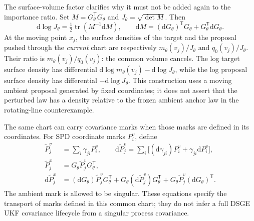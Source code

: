 \documentclass[11pt]{article}
\newcommand{\dd}{\mathrm{d}}
\begin{document}
The surface-volume factor clarifies why it must not be added again to the
importance ratio.  Set $M=G_\theta^\mathsf{T}G_\theta$ and
$J_\theta=\sqrt{\det M}$.  Then
\begin{equation}
 \dd\log J_\theta=\tfrac12\operatorname{tr}(M^{-1}\dd M),\qquad
 \dd M=(\dd G_\theta)^\mathsf{T}G_\theta
                 +G_\theta^\mathsf{T}\dd G_\theta.
 \label{eq:affine-chart-volume}
\end{equation}
At the moving point $x_j$, the surface densities of the target and the
proposal pushed through the \emph{current} chart are respectively
$m_\theta(v_j)/J_\theta$ and $q_0(v_j)/J_\theta$.  Their ratio is
$m_\theta(v_j)/q_0(v_j)$: the common volume cancels.  The log target surface
density has differential $\dd\log m_\theta(v_j)-\dd\log J_\theta$, while
the log proposal surface density has differential $-\dd\log J_\theta$.
This construction uses a moving ambient proposal generated by fixed
coordinates; it does not assert that the perturbed law has a density relative
to the frozen ambient anchor law in the rotating-line counterexample.

The same chart can carry covariance marks when those marks are defined in
its coordinates.  For SPD coordinate marks $P_i^v$, define
\begin{align}
 \widetilde P_j^v&=\sum_i\gamma_{ji}P_i^v,\qquad
 \dd\widetilde P_j^v=\sum_i\bigl[(\dd\gamma_{ji})P_i^v
                                  +\gamma_{ji}\dd P_i^v\bigr],\\
 \widetilde P_j^x&=G_\theta\widetilde P_j^vG_\theta^\mathsf{T},\\
 \dd\widetilde P_j^x&=(\dd G_\theta)\widetilde P_j^vG_\theta^\mathsf{T}
       +G_\theta(\dd\widetilde P_j^v)G_\theta^\mathsf{T}
       +G_\theta\widetilde P_j^v(\dd G_\theta)^\mathsf{T}.
 \label{eq:affine-chart-marks}
\end{align}
The ambient mark is allowed to be singular.  These equations specify the
transport of marks defined in this common chart; they do not infer a full
DSGE UKF covariance lifecycle from a singular process covariance.
\end{document}
